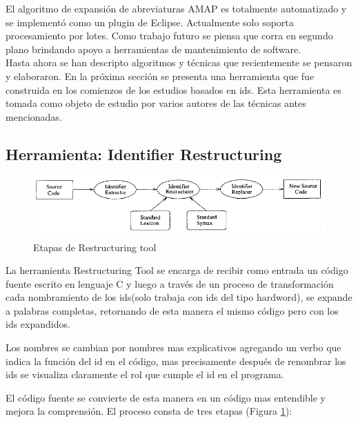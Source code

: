 \documentclass[a4paper,12pt]{report}
\begin{document}
El algoritmo de expansión de abreviaturas AMAP es totalmente automatizado y se implementó como un plugin de Eclipse. Actualmente solo soporta procesamiento por lotes. Como trabajo futuro se piensa que corra en segundo plano brindando apoyo a herramientas de mantenimiento de software\cite{EZH08}.\\

Hasta ahora se han descripto algoritmos y técnicas que recientemente se pensaron y elaboraron. En la próxima sección se presenta una herramienta que fue construida en los comienzos de los estudios basados en ids. Esta herramienta es tomada como objeto de estudio por varios autores de las técnicas antes mencionadas\cite{EZH08,DCHD06,DLHD06,LFBEX07}.


\pagebreak 
\subsection{Herramienta: Identifier Restructuring}

\begin{figure}[h] %
\centering
\includegraphics[scale= 0.80]{./ire_1.png}
\caption{Etapas de Restructuring tool}
\label{ire1}
\end{figure}

La herramienta Restructuring Tool\cite{BCPT00} se encarga de recibir como entrada un código fuente escrito en lenguaje C y luego a través de un proceso de transformación cada nombramiento de los ids(solo trabaja con ids del tipo hardword), se expande a palabras completas, retornando de esta manera el mismo código pero con los ids expandidos.

Los nombres se cambian por nombres mas explicativos agregando un verbo que indica la función del id en el código, mas precisamente después de renombrar los ids se visualiza claramente el rol que cumple el id en el programa.

El código fuente se convierte de esta manera en un código mas entendible y mejora la comprensión. El proceso consta de tres etapas (Figura \ref{ire1}): 
\end{document}
